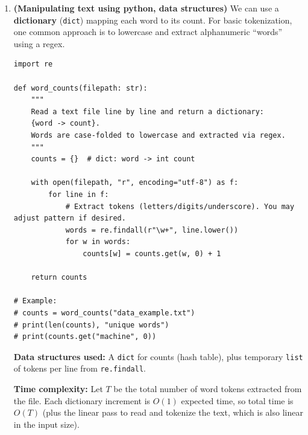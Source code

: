 \documentclass[en,hazy,blue,12pt,normal]{elegantnote}
\begin{document}
\begin{enumerate}[label=\textbf{(\alph*)}, leftmargin=2.2em]
\begin{lstlisting}[style=py]
import numpy as np
from scipy import sparse

def difference_matrix(n: int):
    """
    Return a sparse matrix A of shape ((n-1), n) such that
    for any x in R^n, A @ x = [x1-x2, x2-x3, ..., x_{n-1}-x_n]^T.
    """
    if n < 2:
        raise ValueError("n must be >= 2 so that (n-1) x n is non-empty.")

    data = np.ones(n - 1)
    # diagonal 0 has +1's, diagonal +1 has -1's
    A = sparse.diags([data, -data], offsets=[0, 1], shape=(n - 1, n), format="csr")
    return A

# Example check:
# n = 5
# A = difference_matrix(n)
# x = np.array([1, 3, 6, 10, 15])
# print(A @ x)  # should be [1-3, 3-6, 6-10, 10-15] = [-2, -3, -4, -5]
\end{lstlisting}

\item \textbf{(Manipulating text using python, data structures)}
We can use a \textbf{dictionary} (\texttt{dict}) mapping each word to its count. For basic tokenization, one common approach is to lowercase and extract alphanumeric ``words'' using a regex.

\begin{lstlisting}[style=py]
import re

def word_counts(filepath: str):
    """
    Read a text file line by line and return a dictionary:
    {word -> count}.
    Words are case-folded to lowercase and extracted via regex.
    """
    counts = {}  # dict: word -> int count

    with open(filepath, "r", encoding="utf-8") as f:
        for line in f:
            # Extract tokens (letters/digits/underscore). You may adjust pattern if desired.
            words = re.findall(r"\w+", line.lower())
            for w in words:
                counts[w] = counts.get(w, 0) + 1

    return counts

# Example:
# counts = word_counts("data_example.txt")
# print(len(counts), "unique words")
# print(counts.get("machine", 0))
\end{lstlisting}

\noindent \textbf{Data structures used:} A \texttt{dict} for counts (hash table), plus temporary \texttt{list} of tokens per line from \texttt{re.findall}.

\medskip
\noindent \textbf{Time complexity:} Let $T$ be the total number of word tokens extracted from the file. Each dictionary increment is $O(1)$ expected time, so total time is $O(T)$ (plus the linear pass to read and tokenize the text, which is also linear in the input size).


\end{enumerate}
\end{document}
